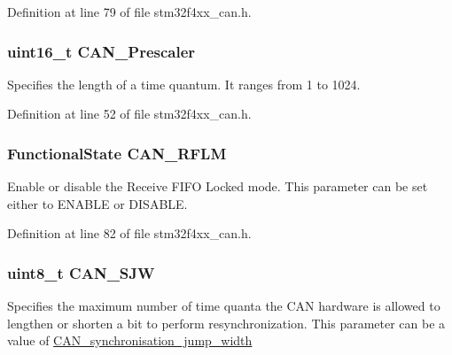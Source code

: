 Definition at line 79 of file stm32f4xx\-\_\-can.\-h.

\hypertarget{struct_c_a_n___init_type_def_abebaaf7d2ff24fcc501c5f39c00b8742}{
\subsubsection[{C\-A\-N\-\_\-\-Prescaler}]{\setlength{\rightskip}{0pt plus 5cm}uint16\-\_\-t C\-A\-N\-\_\-\-Prescaler}}\label{struct_c_a_n___init_type_def_abebaaf7d2ff24fcc501c5f39c00b8742}
Specifies the length of a time quantum. It ranges from 1 to 1024. 

Definition at line 52 of file stm32f4xx\-\_\-can.\-h.

\hypertarget{struct_c_a_n___init_type_def_a8e091965db871827fca02c636f42e3ac}{
\subsubsection[{C\-A\-N\-\_\-\-R\-F\-L\-M}]{\setlength{\rightskip}{0pt plus 5cm}Functional\-State C\-A\-N\-\_\-\-R\-F\-L\-M}}\label{struct_c_a_n___init_type_def_a8e091965db871827fca02c636f42e3ac}
Enable or disable the Receive F\-I\-F\-O Locked mode. This parameter can be set either to E\-N\-A\-B\-L\-E or D\-I\-S\-A\-B\-L\-E. 

Definition at line 82 of file stm32f4xx\-\_\-can.\-h.

\hypertarget{struct_c_a_n___init_type_def_ad3a242b080dd6b9bda227520bf15a580}{
\subsubsection[{C\-A\-N\-\_\-\-S\-J\-W}]{\setlength{\rightskip}{0pt plus 5cm}uint8\-\_\-t C\-A\-N\-\_\-\-S\-J\-W}}\label{struct_c_a_n___init_type_def_ad3a242b080dd6b9bda227520bf15a580}
Specifies the maximum number of time quanta the C\-A\-N hardware is allowed to lengthen or shorten a bit to perform resynchronization. This parameter can be a value of \hyperlink{group___c_a_n__synchronisation__jump__width}{C\-A\-N\-\_\-synchronisation\-\_\-jump\-\_\-width} 

